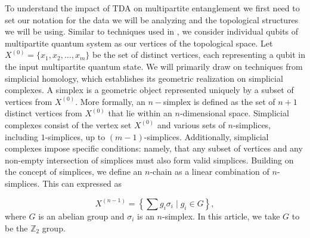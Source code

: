 \documentclass{article}
\newcommand{\rb}[1]{{\textcolor{blue}{RB: #1}}}
\begin{document}
To understand the impact of TDA on multipartite entanglement we first need to set our notation for the data we will be analyzing and the topological structures we will be using. Similar to techniques used in \cite{hamilton2023probing}, we consider individual qubits of multipartite quantum system as our vertices of the topological space. Let $ X^{(0)} = \{x_1, x_2, \dots, x_m\} $ be the set of distinct vertices, each representing a qubit in the input multipartite quantum state. We will primarily draw on techniques from simplicial homology, which establishes its geometric realization on simplicial complexes. A simplex is a geometric object represented uniquely by a subset of vertices from $ X^{(0)} $. More formally, an $ n-$simplex is defined as the set of $ n+1 $ distinct vertices from $ X^{(0)} $ that lie within an $ n $-dimensional space. Simplicial complexes consist of the vertex set $ X^{(0)} $ and various sets of $ n $-simplices, including  $ 1 $-simplices, up to $ (m-1) $-simplices. Additionally, simplicial complexes impose specific conditions: namely, that any subset of vertices and any non-empty intersection of simplices must also form valid simplices. Building on the concept of simplices, we define an $ n $-chain as a linear combination of $ n $-simplices. This can expressed as

$$
X^{(n-1)} = \left\{ \sum g_i \sigma_i \mid g_i \in G \right\},
$$
where $ G $ is an abelian group and $\sigma_i$ is an $n$-simplex. In this article, we take $ G $ to be the $ \mathbb{Z}_2 $ group.
\end{document}
